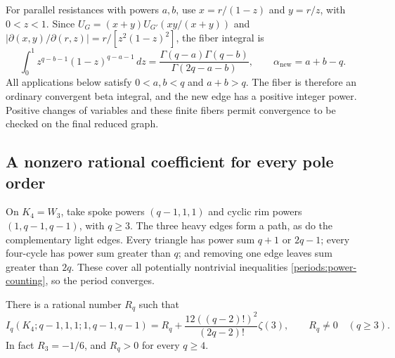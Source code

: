 For parallel resistances with powers $a,b$, use
$x=r/(1-z)$ and $y=r/z$, with $0<z<1$.  Since
$U_G=(x+y)U_{G'}(xy/(x+y))$ and
$|\partial(x,y)/\partial(r,z)|=r/[z^2(1-z)^2]$, the fiber integral is
\begin{equation}
 \int_0^1 z^{q-b-1}(1-z)^{q-a-1}\,dz
 =\frac{\Gamma(q-a)\Gamma(q-b)}{\Gamma(2q-a-b)},
 \qquad \alpha_{\mathrm{new}}=a+b-q.
 \label{periods:parallel-beta}
\end{equation}
All applications below satisfy $0<a,b<q$ and $a+b>q$.  The fiber is
therefore an ordinary convergent beta integral, and the new edge has a
positive integer power.  Positive changes of variables and these finite
fibers permit convergence to be checked on the final reduced graph.

\subsection{A nonzero rational coefficient for every pole order}
\label{periods:k4-direction}

On $K_4=W_3$, take spoke powers $(q-1,1,1)$ and cyclic rim powers
$(1,q-1,q-1)$, with $q\ge3$.  The three heavy edges form a path, as do
the complementary light edges.  Every triangle has power sum $q+1$ or
$2q-1$; every four-cycle has power sum greater than $q$; and removing
one edge leaves sum greater than $2q$.  These cover all potentially
nontrivial inequalities \eqref{periods:power-counting}, so the period
converges.

\begin{lemma}
\label{periods:k4-rational}
There is a rational number $R_q$ such that
\begin{equation}
 I_q(K_4;q-1,1,1;1,q-1,q-1)
 =R_q+\frac{12((q-2)!)^2}{(2q-2)!}\zeta(3),
 \qquad R_q\ne0\quad(q\ge3).
 \label{periods:k4-value}
\end{equation}
In fact $R_3=-1/6$, and $R_q>0$ for every $q\ge4$.
\end{lemma}

